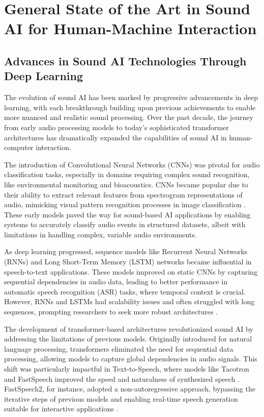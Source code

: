 \section{General State of the Art in Sound AI for Human-Machine Interaction}

\subsection{Advances in Sound AI Technologies Through Deep Learning}

The evolution of sound AI has been marked by progressive advancements in deep learning, with each breakthrough building upon previous achievements to enable more nuanced and realistic sound processing. Over the past decade, the journey from early audio processing models to today’s sophisticated transformer architectures has dramatically expanded the capabilities of sound AI in human-computer interaction.

The introduction of Convolutional Neural Networks (CNNs) was pivotal for audio classification tasks, especially in domains requiring complex sound recognition, like environmental monitoring and bioacoustics. CNNs became popular due to their ability to extract relevant features from spectrogram representations of audio, mimicking visual pattern recognition processes in image classification \cite{purwins2019deep}. These early models paved the way for sound-based AI applications by enabling systems to accurately classify audio events in structured datasets, albeit with limitations in handling complex, variable audio environments.

As deep learning progressed, sequence models like Recurrent Neural Networks (RNNs) and Long Short-Term Memory (LSTM) networks became influential in speech-to-text applications\cite{purwins2019deep}. These models improved on static CNNs by capturing sequential dependencies in audio data, leading to better performance in automatic speech recognition (ASR) tasks, where temporal context is crucial. However, RNNs and LSTMs had scalability issues and often struggled with long sequences, prompting researchers to seek more robust architectures \cite{dong2018speech}.

The development of transformer-based architectures revolutionized sound AI by addressing the limitations of previous models. Originally introduced for natural language processing, transformers eliminated the need for sequential data processing, allowing models to capture global dependencies in audio signals. This shift was particularly impactful in Text-to-Speech, where models like Tacotron and FastSpeech improved the speed and naturalness of synthesized speech \cite{ren2019fastspeech, wang2017tacotron}. FastSpeech2, for instance, adopted a non-autoregressive approach, bypassing the iterative steps of previous models and enabling real-time speech generation suitable for interactive applications \cite{ren2020fastspeech}. 

